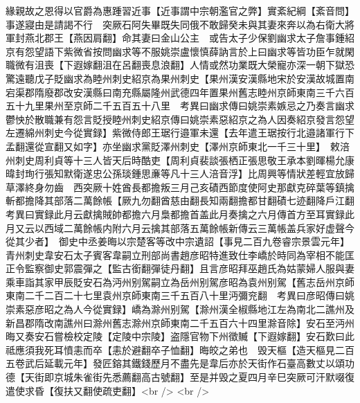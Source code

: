 緣親故之恩得以官爵為惠踵習近事【近事謂中宗朝濫官之弊】實紊紀綱【紊音問】事遂寢由是請謁不行　突厥石阿失畢既失同俄不敢歸癸未與其妻來奔以為右衛大將軍封燕北郡王【燕因肩翻】命其妻曰金山公主　或告太子少保劉幽求太子詹事鍾紹京有怨望語下紫微省按問幽求等不服姚崇盧懷慎薛訥言於上曰幽求等皆功臣乍就閑職微有沮喪【下遐嫁翻沮在呂翻喪息浪翻】人情或然功業既大榮寵亦深一朝下獄恐驚遠聽戊子貶幽求為睦州刺史紹京為果州刺史【果州漢安漢縣地宋於安漢故城置南宕渠郡隋廢郡改安漢縣曰南充縣屬隆州武德四年置果州舊志睦州京師東南三千六百五十九里果州至京師二千五百五十八里　考異曰幽求傳曰姚崇素嫉忌之乃奏言幽求鬱怏於散職兼有怨言貶授睦州刺史紹京傳曰姚崇素惡紹京之為人因奏紹京發言怨望左遷綿州刺史今從實録】紫微侍郎王琚行邉軍未還【去年遣王琚按行北邉諸軍行下孟翻還從宣翻又如字】亦坐幽求黨貶澤州刺史【澤州京師東北一千三十里】　敕涪州刺史周利貞等十三人皆天后時酷吏【周利貞裴談張栖正張思敬王承本劉暉楊允康暐封珣行張知默衛遂忠公孫琰鍾思亷等凡十三人涪音浮】比周興等情狀差輕宜放歸草澤終身勿齒　西突厥十姓酋長都擔叛三月己亥磧西節度使阿史那獻克碎葉等鎮擒斬都擔降其部落二萬餘帳【厥九勿翻酋慈由翻長知兩翻擔都甘翻磧七迹翻降戶江翻　考異曰實録此月云獻擒賊帥都擔六月梟都擔首盖此月奏擒之六月傳首方至耳實録此月又云以西域二萬餘帳内附六月云擒其部落五萬餘帳新傳云三萬帳盖兵家好虚聲今從其少者】　御史中丞姜晦以宗楚客等改中宗遺詔【事見二百九卷睿宗景雲元年】青州刺史韋安石太子賓客韋嗣立刑部尚書趙彦昭特進致仕李嶠於時同為宰相不能匡正令監察御史郭震彈之【監古銜翻彈徒丹翻】且言彦昭拜巫趙氏為姑蒙婦人服與妻乘車詣其家甲辰貶安石為沔州别駕嗣立為岳州别駕彦昭為袁州别駕【舊志岳州京師東南二千二百二十七里袁州京師東南三千五百八十里沔彌兖翻　考異曰彦昭傳曰姚崇素惡彦昭之為人今從實録】嶠為滁州别駕【滁州漢全椒縣地江左為南北二譙州及新昌郡隋改南譙州曰滁州舊志滁州京師東南二千五百六十四里滁音除】安石至沔州晦又奏安石嘗檢校定陵【定陵中宗陵】盗隱官物下州徵贓【下遐嫁翻】安石歎曰此祗應須我死耳憤恚而卒【恚於避翻卒子恤翻】晦皎之弟也　毁天樞【造天樞見二百五卷武后延載元年】發匠鎔其鐵錢歷月不盡先是韋后亦於天街作石臺高數丈以頌功德【天街即京城朱雀街先悉薦翻高古號翻】至是并毁之夏四月辛巳突厥可汗默啜復遣使求昏【復扶又翻使疏吏翻】<br />
<br />
